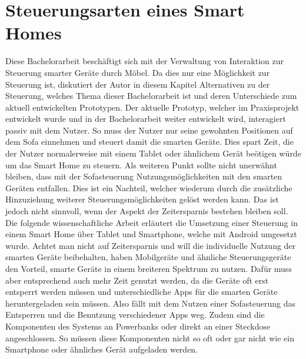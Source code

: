 \section{Steuerungsarten eines Smart Homes}
Diese Bachelorarbeit beschäftigt sich mit der Verwaltung von Interaktion zur Steuerung smarter Geräte durch Möbel. Da dies nur eine Möglichkeit zur Steuerung ist, diskutiert der Autor in diesem Kapitel Alternativen zu der Steuerung, welches Thema dieser Bachelorarbeit ist und deren Unterschiede zum aktuell entwickelten Prototypen.
\newline
\newline
Der aktuelle Prototyp, welcher im Praxisprojekt entwickelt wurde und in der Bachelorarbeit weiter entwickelt wird, interagiert passiv mit dem Nutzer. So muss der Nutzer nur seine gewohnten Positionen auf dem Sofa einnehmen und steuert damit die smarten Geräte. Dies spart Zeit, die der Nutzer normalerweise mit einem Tablet oder ähnlichem Gerät beötigen würde um das Smart Home zu steuern. Als weiteren Punkt sollte nicht unerwähnt bleiben, dass mit der Sofasteuerung Nutzungsmöglichkeiten mit den smarten Geräten entfallen. Dies ist ein Nachteil, welcher wiederum durch die zusätzliche Hinzuziehung weiterer Steuerungsmöglichkeiten gelöst werden kann. Das ist jedoch nicht sinnvoll, wenn der Aspekt der Zeitersparnis bestehen bleiben soll. Die folgende wissenschaftliche Arbeit \citep{piyare2013internet} erläutert die Umsetzung einer Steuerung in einem Smart Home über Tablet und Smartphone, welche mit Android umgesetzt wurde.
\newline
Achtet man nicht auf Zeitersparnis und will die individuelle Nutzung der smarten Geräte beibehalten, haben Mobilgeräte und ähnliche Steuerungsgeräte den Vorteil, smarte Geräte in einem breiteren Spektrum zu nutzen. Dafür muss aber entsprechend auch mehr Zeit genutzt werden, da die Geräte oft erst entsperrt werden müssen und unterschiedliche Apps für die smarten Geräte heruntergeladen sein müssen. Also fällt mit dem Nutzen einer Sofasteuerung das Entsperren und die Benutzung verschiedener Apps weg. Zudem sind die Komponenten des Systems an Powerbanks oder direkt an einer Steckdose angeschlossen. So müssen diese Komponenten nicht so oft oder gar nicht wie ein Smartphone oder ähnliches Gerät aufgeladen werden.

